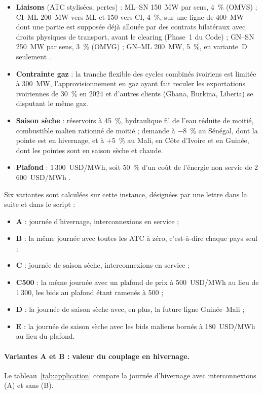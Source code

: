\documentclass[a4paper,12pt]{article}
\theoremstyle{definition}
\begin{document}
\begin{itemize}
\item \textbf{Liaisons} (ATC stylisées, pertes) : ML--SN 150~MW par sens, 4~\% (OMVS) ; CI--ML 200~MW vers ML et 150 vers CI, 4~\%, sur une ligne de 400~MW \citep{wapp2012ferke} dont une partie est supposée déjà allouée par des contrats bilatéraux avec droits physiques de transport, avant le clearing (Phase~1 du Code) ; GN--SN 250~MW par sens, 3~\% (OMVG) ; GN--ML 200~MW, 5~\%, en variante~D seulement \citep{afdb2026guineemali}.
\item \textbf{Contrainte gaz} : la tranche flexible des cycles combinés ivoiriens est limitée à 300~MW, l'approvisionnement en gaz ayant fait reculer les exportations ivoiriennes de 30~\% en 2024 et d'autres clients (Ghana, Burkina, Liberia) se disputant le même gaz.
\item \textbf{Saison sèche} : réservoirs à 45~\%, hydraulique fil de l'eau réduite de moitié, combustible malien rationné de moitié ; demande à $-8$~\% au Sénégal, dont la pointe est en hivernage, et à $+5$~\% au Mali, en Côte d'Ivoire et en Guinée, dont les pointes sont en saison sèche et chaude.
\item \textbf{Plafond} : 1\,300~USD/MWh, soit 50~\% d'un coût de l'énergie non servie de 2\,600~USD/MWh \citep{wapp2018masterplan}.
\end{itemize}

Six variantes sont calculées sur cette instance, désignées par une lettre dans la suite et dans le script :

\begin{itemize}
\item \textbf{A} : journée d'hivernage, interconnexions en service ;
\item \textbf{B} : la même journée avec toutes les ATC à zéro, c'est-à-dire chaque pays seul ;
\item \textbf{C} : journée de saison sèche, interconnexions en service ;
\item \textbf{C500} : la même journée avec un plafond de prix à 500~USD/MWh au lieu de 1\,300, les bids au plafond étant ramenés à 500 ;
\item \textbf{D} : la journée de saison sèche avec, en plus, la future ligne Guinée--Mali ;
\item \textbf{E} : la journée de saison sèche avec les bids maliens bornés à 180~USD/MWh au lieu du plafond.
\end{itemize}

\paragraph{Variantes A et B : valeur du couplage en hivernage.} Le tableau~\ref{tab:application} compare la journée d'hivernage avec interconnexions (A) et sans (B).
\end{document}
